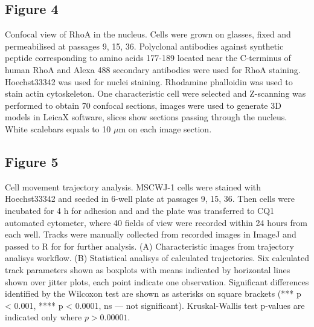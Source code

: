 \documentclass[alpha-refs]{wiley-article}
\begin{document}
\subsection*{Figure 4}
Confocal view of RhoA in the nucleus.
Cells were grown on glasses, fixed and permeabilised at passages 9, 15, 36.
Polyclonal antibodies against synthetic peptide corresponding to amino acids 177-189 located near the C-terminus of human RhoA and Alexa 488 secondary antibodies were used for RhoA staining.
Hoechst33342 was used for nuclei staining.
Rhodamine phalloidin was used to stain actin cytoskeleton.
One characteristic cell were selected and Z-scanning was performed to obtain 70 confocal sections, images were used to generate 3D models in LeicaX software, slices show sections passing through the nucleus.
White scalebars equals to 10 $\mu$m on each image section.


\subsection*{Figure 5}
Cell movement trajectory analysis.
MSCWJ-1 cells were stained with Hoechst33342 and seeded in 6-well plate at passages 9, 15, 36.
Then cells were incubated for 4 h for adhesion and and the plate was transferred to CQ1 automated cytometer, where 40 fields of view were recorded within 24 hours from each well.
Tracks were manually collected from recorded images in ImageJ and passed to R for for further analysis.
(A) Characteristic images from trajectory analisys workflow.
(B) Statistical analisys of calculated trajectories.
Six calculated track parameters shown as boxplots with means indicated by horizontal lines shown over jitter plots, each point indicate one observation.
Significant differences identified by the Wilcoxon test are shown as asterisks on square brackets (*** p < 0.001, **** p < 0.0001, ns --- not significant).
Kruskal-Wallis test p-values are indicated only where $p > 0.00001$.
\end{document}
